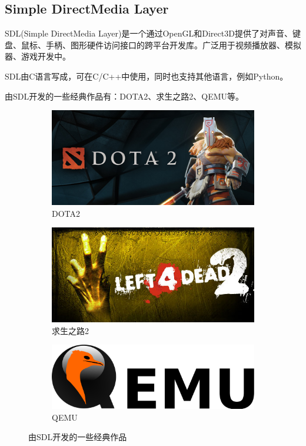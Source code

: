 \documentclass[a4paper]{ltxdoc}
\begin{document}
{\subsection{Simple DirectMedia Layer}
SDL(Simple DirectMedia Layer)是一个通过OpenGL和Direct3D提供了对声音、键盘、鼠标、手柄、图形硬件访问接口的跨平台开发库。广泛用于视频播放器、模拟器、游戏开发中。

SDL由C语言写成，可在C/C++中使用，同时也支持其他语言，例如Python。

由SDL开发的一些经典作品有：DOTA2、求生之路2、QEMU等。

\begin{figure}[h]
	\centering
		\begin{subfigure}[b]{0.3\textwidth}
			\includegraphics[width=\textwidth]{images/dota2.jpg}
			\caption{DOTA2}
		\end{subfigure}
		\begin{subfigure}[b]{0.3\textwidth}
			\includegraphics[width=\textwidth]{images/left4dead2.jpg}
			\caption{求生之路2}
		\end{subfigure}
		\begin{subfigure}[b]{0.3\textwidth}
			\includegraphics[width=\textwidth]{images/qemu.png}
			\caption{QEMU}
		\end{subfigure}
		\caption{由SDL开发的一些经典作品}
		\label{fig:sdl}
\end{figure}

}
\end{document}
